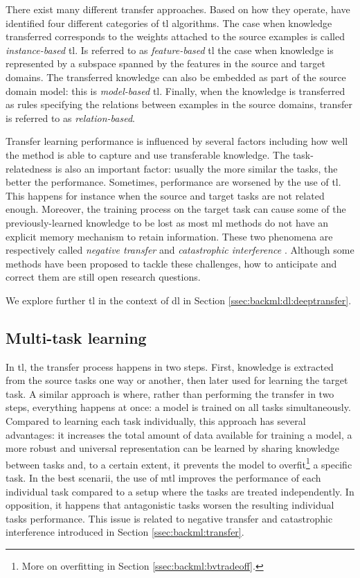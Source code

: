 There exist many different transfer approaches. Based on how they operate,
\cite{yang2020transfer} have identified four different categories of \acrlong{tl}
algorithms. The case when knowledge transferred corresponds to the weights attached
to the source examples is called \textit{instance-based} \acrlong{tl}. Is referred
to as \textit{feature-based} \acrlong{tl} the case when knowledge is represented
by a subspace spanned by the features in the source and target domains. The
transferred knowledge can also be embedded as part of the source domain model:
this is \textit{model-based} \acrlong{tl}. Finally, when the knowledge is transferred
as rules specifying the relations between examples in the source domains, transfer
is referred to as \textit{relation-based}.

Transfer learning performance is influenced by several factors including how well
the method is able to capture and use transferable knowledge. The task-relatedness
is also an important factor: usually the more similar the tasks, the better the
performance. Sometimes, performance are worsened by the use of \acrlong{tl}. This
happens for instance when the source and target tasks are not related enough.
Moreover, the training process on the target task can cause some of the
previously-learned knowledge to be lost as most \acrlong{ml} methods do not have
an explicit memory mechanism to retain information. These two phenomena are
respectively called \textit{negative transfer} \cite{zhang2020overcoming}
and \textit{catastrophic interference} \cite{french1999catastrophic}. Although
some methods have been proposed to tackle these challenges, how to anticipate and
correct them are still open research questions.

We explore further \acrlong{tl} in the context of \acrlong{dl} in Section
\ref{ssec:backml:dl:deeptransfer}.

\subsection{Multi-task learning}
\label{ssec:backml:mtl}

In \acrlong{tl}, the transfer process happens in two steps. First, knowledge is
extracted from the source tasks one way or another, then later used for learning
the target task. A similar approach is  where, rather than performing
the transfer in two steps, everything happens at once: a model is trained on all
tasks simultaneously. Compared to learning each task individually, this approach
has several advantages: it increases the total amount of data available for training
a model, a more robust and universal representation can be learned by sharing
knowledge between tasks and, to a certain extent, it prevents the model to
overfit\footnote{More on overfitting in Section \ref{ssec:backml:bvtradeoff}.}
a specific task. In the best scenarii, the use of \acrlong{mtl} improves the
performance of each individual task compared to a setup where the tasks are treated
independently. In opposition, it happens that antagonistic tasks worsen the
resulting individual tasks performance. This issue is related to negative transfer
and catastrophic interference introduced in Section \ref{ssec:backml:transfer}.

